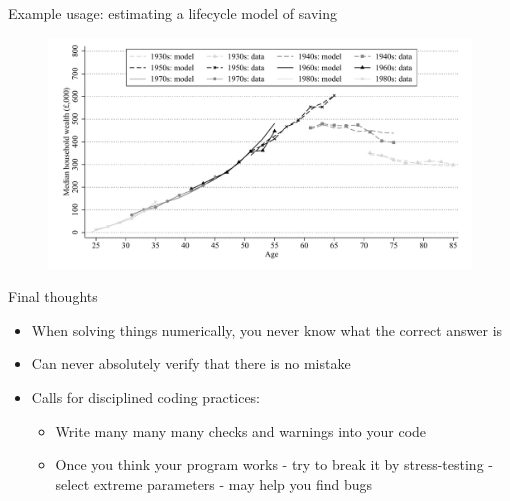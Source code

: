 \documentclass[aspectratio=169]{beamer}
\begin{document}
\begin{frame}{Example usage: estimating a lifecycle model of saving}

\begin{figure}
	\includegraphics[height=0.8\textheight]{figures/Model_fit_all_gens.pdf}
\end{figure}

\end{frame}


\begin{frame}{Final thoughts}
\begin{itemize}
\item When solving things numerically, you never know what the correct answer is
\item Can never absolutely verify that there is no mistake
\item Calls for disciplined coding practices:
\begin{itemize}
\item Write many many many checks and warnings into your code
\item Once you think your program works - try to break it by stress-testing - select extreme parameters - may help you find bugs
\end{itemize}
\end{itemize}

\end{frame}
\end{document}
